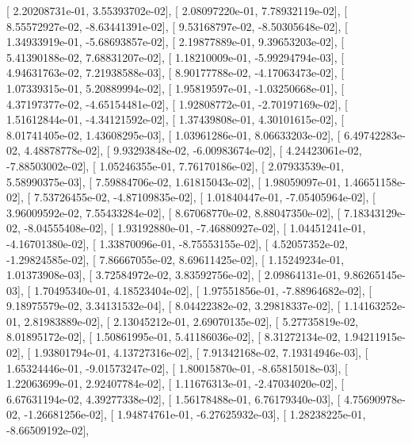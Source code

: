 \documentclass{article}
\begin{document}
       [  2.20208731e-01,   3.55393702e-02],
       [  2.08097220e-01,   7.78932119e-02],
       [  8.55572927e-02,  -8.63441391e-02],
       [  9.53168797e-02,  -8.50305648e-02],
       [  1.34933919e-01,  -5.68693857e-02],
       [  2.19877889e-01,   9.39653203e-02],
       [  5.41390188e-02,   7.68831207e-02],
       [  1.18210009e-01,  -5.99294794e-03],
       [  4.94631763e-02,   7.21938588e-03],
       [  8.90177788e-02,  -4.17063473e-02],
       [  1.07339315e-01,   5.20889994e-02],
       [  1.95819597e-01,  -1.03250668e-01],
       [  4.37197377e-02,  -4.65154481e-02],
       [  1.92808772e-01,  -2.70197169e-02],
       [  1.51612844e-01,  -4.34121592e-02],
       [  1.37439808e-01,   4.30101615e-02],
       [  8.01741405e-02,   1.43608295e-03],
       [  1.03961286e-01,   8.06633203e-02],
       [  6.49742283e-02,   4.48878778e-02],
       [  9.93293848e-02,  -6.00983674e-02],
       [  4.24423061e-02,  -7.88503002e-02],
       [  1.05246355e-01,   7.76170186e-02],
       [  2.07933539e-01,   5.58990375e-03],
       [  7.59884706e-02,   1.61815043e-02],
       [  1.98059097e-01,   1.46651158e-02],
       [  7.53726455e-02,  -4.87109835e-02],
       [  1.01840447e-01,  -7.05405964e-02],
       [  3.96009592e-02,   7.55433284e-02],
       [  8.67068770e-02,   8.88047350e-02],
       [  7.18343129e-02,  -8.04555408e-02],
       [  1.93192880e-01,  -7.46880927e-02],
       [  1.04451241e-01,  -4.16701380e-02],
       [  1.33870096e-01,  -8.75553155e-02],
       [  4.52057352e-02,  -1.29824585e-02],
       [  7.86667055e-02,   8.69611425e-02],
       [  1.15249234e-01,   1.01373908e-03],
       [  3.72584972e-02,   3.83592756e-02],
       [  2.09864131e-01,   9.86265145e-03],
       [  1.70495340e-01,   4.18523404e-02],
       [  1.97551856e-01,  -7.88964682e-02],
       [  9.18975579e-02,   3.34131532e-04],
       [  8.04422382e-02,   3.29818337e-02],
       [  1.14163252e-01,   2.81983889e-02],
       [  2.13045212e-01,   2.69070135e-02],
       [  5.27735819e-02,   8.01895172e-02],
       [  1.50861995e-01,   5.41186036e-02],
       [  8.31272134e-02,   1.94211915e-02],
       [  1.93801794e-01,   4.13727316e-02],
       [  7.91342168e-02,   7.19314946e-03],
       [  1.65324446e-01,  -9.01573247e-02],
       [  1.80015870e-01,  -8.65815018e-03],
       [  1.22063699e-01,   2.92407784e-02],
       [  1.11676313e-01,  -2.47034020e-02],
       [  6.67631194e-02,   4.39277338e-02],
       [  1.56178488e-01,   6.76179340e-03],
       [  4.75690978e-02,  -1.26681256e-02],
       [  1.94874761e-01,  -6.27625932e-03],
       [  1.28238225e-01,  -8.66509192e-02],
\end{document}
